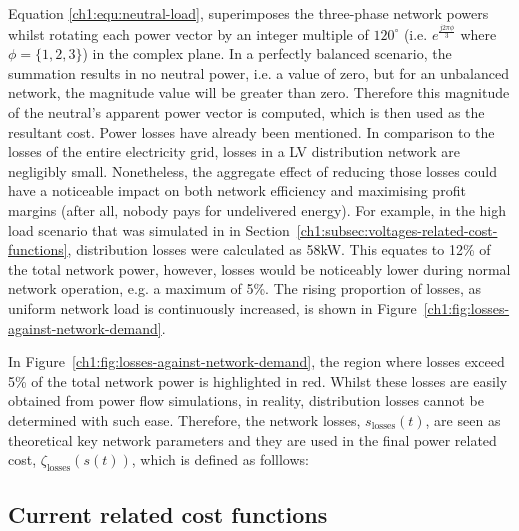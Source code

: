 

Equation \ref{ch1:equ:neutral-load}, superimposes the three-phase network powers whilst rotating each power vector by an integer multiple of $120^\circ$ (i.e. $e^\frac{j2\pi \phi}{3}$ where $\phi = \{1, 2, 3\}$) in the complex plane.
In a perfectly balanced scenario, the summation results in no neutral power, i.e. a value of zero, but for an unbalanced network, the magnitude value will be greater than zero.
Therefore this magnitude of the neutral's apparent power vector is computed, which is then used as the resultant cost.
Power losses have already been mentioned.
In comparison to the losses of the entire electricity grid, losses in a LV distribution network are negligibly small.
Nonetheless, the aggregate effect of reducing those losses could have a noticeable impact on both network efficiency and maximising profit margins (after all, nobody pays for undelivered energy).
For example, in the high load scenario that was simulated in in Section~\ref{ch1:subsec:voltages-related-cost-functions}, distribution losses were calculated as 58kW.
This equates to 12\% of the total network power, however, losses would be noticeably lower during normal network operation, e.g. a maximum of 5\%.
The rising proportion of losses, as uniform network load is continuously increased, is shown in Figure~\ref{ch1:fig:losses-against-network-demand}.




In Figure~\ref{ch1:fig:losses-against-network-demand}, the region where losses exceed 5\% of the total network power is highlighted in red.
Whilst these losses are easily obtained from power flow simulations, in reality, distribution losses cannot be determined with such ease.
Therefore, the network losses, $s_\text{losses}(t)$, are seen as theoretical key network parameters and they are used in the final power related cost, $\zeta_\text{losses}(s(t))$, which is defined as folllows:



\subsection{Current related cost functions}
\label{ch1:subsec:currents-related-cost-functions}

